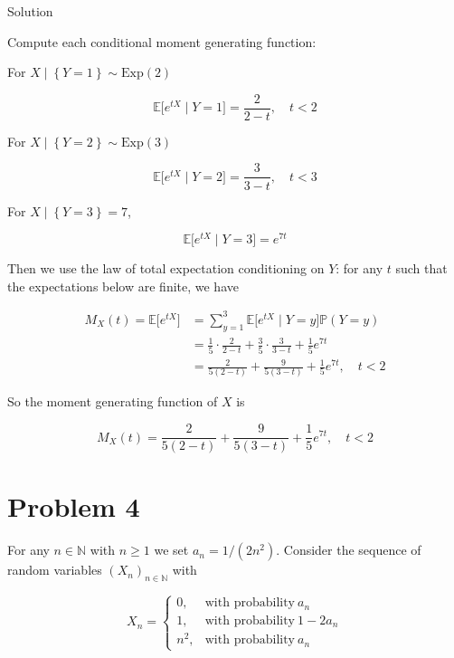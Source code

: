 \documentclass{qlnotes-export}
\begin{document}
\begin{qlsolution}{Solution}

Compute each conditional moment generating function:

For \(X \mid \left\{ {Y = 1} \right\} \sim \text{Exp}(2)\)

\[{\mathbb{E}}\lbrack e^{tX} \mid Y = 1\rbrack = \frac{2}{2 - t},\quad t < 2\]

For \(X \mid \left\{ {Y = 2} \right\} \sim \text{Exp}(3)\)

\[{\mathbb{E}}\lbrack e^{tX} \mid Y = 2\rbrack = \frac{3}{3 - t},\quad t < 3\]

For \(X \mid \left\{ {Y = 3} \right\} = 7\),

\[{\mathbb{E}}\lbrack e^{tX} \mid Y = 3\rbrack = e^{7t}\]

Then we use the law of total expectation conditioning on \(Y\): for any \(t\) such that the expectations below are finite, we have

\[\begin{matrix}
{M_{X}(t) = {\mathbb{E}}\lbrack e^{tX}\rbrack} & {= \sum\limits_{y = 1}^{3}{\mathbb{E}}\lbrack e^{tX} \mid Y = y\rbrack{\mathbb{P}}(Y = y)} \\
 & {= \frac{1}{5} \cdot \frac{2}{2 - t} + \frac{3}{5} \cdot \frac{3}{3 - t} + \frac{1}{5}e^{7t}} \\
 & {= \frac{2}{5(2 - t)} + \frac{9}{5(3 - t)} + \frac{1}{5}e^{7t},\quad t < 2}
\end{matrix}\]

So the moment generating function of \(X\) is

\[M_{X}(t) = \frac{2}{5(2 - t)} + \frac{9}{5(3 - t)} + \frac{1}{5}e^{7t},\quad t < 2\]

\end{qlsolution}

\section{Problem 4}\label{problem-4-4}

For any \(n \in {\mathbb{N}}\) with \(n \geq 1\) we set \(a_{n} = 1/\left( {2n^{2}} \right)\). Consider the sequence of random variables \(\left( X_{n} \right)_{n \in {\mathbb{N}}}\) with

\[X_{n} = \left\{ \begin{matrix}
{0,} & {\text{with probability}\ a_{n}} \\
{1,} & {\text{with probability}\ 1 - 2a_{n}} \\
{n^{2},} & {\text{with probability}\ a_{n}}
\end{matrix} \right.\]
\end{document}
